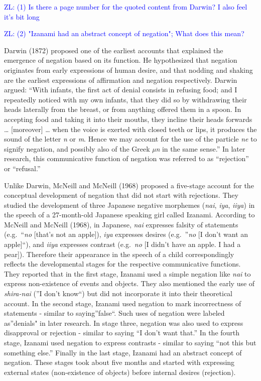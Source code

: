 \documentclass[
  english,
  man,floatsintext]{apa6}
\begin{document}
\textcolor{blue}{ZL: (1) Is there a page number for the quoted content from Darwin? I also feel it's bit long}

\textcolor{blue}{ZL: (2) "Izanami had an abstract concept of negation"; What does this mean?}

Darwin (1872) proposed one of the earliest accounts that explained the emergence of negation based on its function. He hypothesized that negation originates from early expressions of human desire, and that nodding and shaking are the earliest expressions of affirmation and negation respectively. Darwin argued: ``With infants, the first act of denial consists in refusing food; and I repeatedly noticed with my own infants, that they did so by withdrawing their heads laterally from the breast, or from anything offered them in a spoon. In accepting food and taking it into their mouths, they incline their heads forwards \ldots{} {[}moreover{]} \ldots{} when the voice is exerted with closed teeth or lips, it produces the sound of the letter \emph{n} or \emph{m}. Hence we may account for the use of the particle \emph{ne} to signify negation, and possibly also of the Greek \emph{µn} in the same sense.'' In later research, this communicative function of negation was referred to as ``rejection'' or ``refusal.''

Unlike Darwin, McNeill and McNeill (1968) proposed a five-stage account for the conceptual development of negation that did not start with rejections. They studied the development of three Japanese negative morphemes (\emph{nai}, \emph{iya}, \emph{iiya}) in the speech of a 27-month-old Japanese speaking girl called Izanami. According to McNeill and McNeill (1968), in Japanese, \emph{nai} expresses falsity of statements (e.g.~``\emph{no} {[}that's not an apple{]}), \emph{iya} expresses desires (e.g.~''\emph{no} {[}I don't want an apple{]}``), and \emph{iiya} expresses contrast (e.g.~\emph{no} {[}I didn't have an apple. I had a pear{]}). Therefore their appearance in the speech of a child correspondingly reflects the developmental stages for the respective communicative functions. They reported that in the first stage, Izanami used a simple negation like \emph{nai} to express non-existence of events and objects. They also mentioned the early use of \emph{shira-nai} (''I don't know``) but did not incorporate it into their theoretical account. In the second stage, Izanami used negation to mark incorrectness of statements - similar to saying''false``. Such uses of negation were labeled as''denials" in later research. In stage three, negation was also used to express disapproval or rejection - similar to saying ``I don't want that.'' In the fourth stage, Izanami used negation to express contrasts - similar to saying ``not this but something else.'' Finally in the last stage, Izanami had an abstract concept of negation. These stages took about five months and started with expressing external states (non-existence of objects) before internal desires (rejection).
\end{document}
